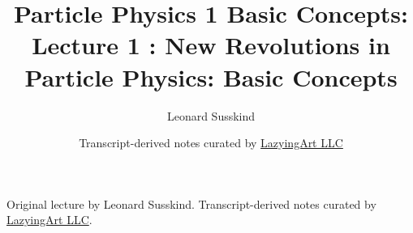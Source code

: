 \documentclass[11pt,oneside]{book}
\begin{document}
\frontmatter
\title{Particle Physics 1 Basic Concepts: Lecture 1 : New Revolutions in Particle Physics: Basic Concepts}
\author{Leonard Susskind}
\date{Transcript-derived notes curated by \href{https://lazying.art}{LazyingArt LLC}}
\maketitle
\begin{center}
\small Original lecture by Leonard Susskind. Transcript-derived notes curated by \href{https://lazying.art}{LazyingArt LLC}.
\end{center}
\clearpage
\mainmatter

\end{document}

